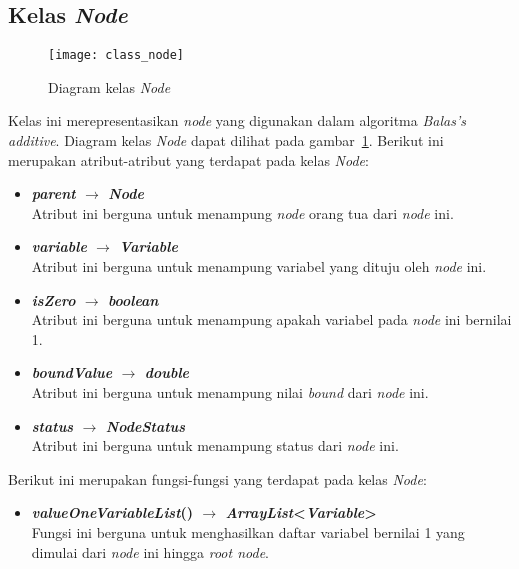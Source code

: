 \subsection{Kelas \textit{Node}}
\begin{figure}[H]
	\centering  
	\texttt{[image: class\_node]}
	\caption[Diagram kelas \textit{Node}]{Diagram kelas \textit{Node}}
	\label{fig:class_node}
\end{figure}
Kelas ini merepresentasikan \textit{node} yang digunakan dalam algoritma \textit{Balas's additive}. Diagram kelas \textit{Node} dapat dilihat pada gambar~\ref{fig:class_node}. Berikut ini merupakan atribut-atribut yang terdapat pada kelas \textit{Node}:
\begin{itemize}
	\item \textbf{\textit{parent} $\rightarrow$ \textit{Node}}\\
	Atribut ini berguna untuk menampung \textit{node} orang tua dari \textit{node} ini.
	\item \textbf{\textit{variable} $\rightarrow$ \textit{Variable}}\\
	Atribut ini berguna untuk menampung variabel yang dituju oleh \textit{node} ini.
	\item \textbf{\textit{isZero} $\rightarrow$ \textit{boolean}}\\
	Atribut ini berguna untuk menampung apakah variabel pada \textit{node} ini bernilai 1.
	\item \textbf{\textit{boundValue} $\rightarrow$ \textit{double}}\\
	Atribut ini berguna untuk menampung nilai \textit{bound} dari \textit{node} ini.
	\item \textbf{\textit{status} $\rightarrow$ \textit{NodeStatus}}\\
	Atribut ini berguna untuk menampung status dari \textit{node} ini.
\end{itemize}
Berikut ini merupakan fungsi-fungsi yang terdapat pada kelas \textit{Node}:
\begin{itemize}
	\item \textbf{\textit{valueOneVariableList}() $\rightarrow$ \textit{ArrayList}<\textit{Variable}>}\\
	Fungsi ini berguna untuk menghasilkan daftar variabel bernilai 1 yang dimulai dari \textit{node} ini hingga \textit{root node}.
\end{itemize}

